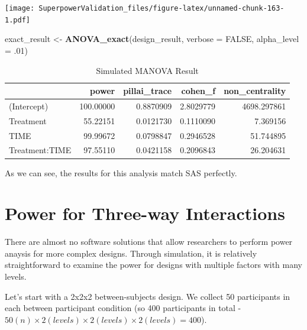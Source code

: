 \documentclass[
]{book}
\newenvironment{Shaded}{\begin{snugshade}}{\end{snugshade}}
\newcommand{\DataTypeTok}[1]{\textcolor[rgb]{0.13,0.29,0.53}{#1}}
\newcommand{\FloatTok}[1]{\textcolor[rgb]{0.00,0.00,0.81}{#1}}
\newcommand{\KeywordTok}[1]{\textcolor[rgb]{0.13,0.29,0.53}{\textbf{#1}}}
\newcommand{\NormalTok}[1]{#1}
\newcommand{\OtherTok}[1]{\textcolor[rgb]{0.56,0.35,0.01}{#1}}
\newcommand{\StringTok}[1]{\textcolor[rgb]{0.31,0.60,0.02}{#1}}
\begin{document}
\texttt{[image: SuperpowerValidation\_files/figure-latex/unnamed-chunk-163-1.pdf]}

\begin{Shaded}
\begin{Highlighting}[]
\NormalTok{exact_result <-}\StringTok{ }\KeywordTok{ANOVA_exact}\NormalTok{(design_result, }\DataTypeTok{verbose =} \OtherTok{FALSE}\NormalTok{,}
                            \DataTypeTok{alpha_level =} \FloatTok{.01}\NormalTok{)}
\end{Highlighting}
\end{Shaded}

\begin{table}[!h]

\caption{\label{tab:unnamed-chunk-164}Simulated MANOVA Result}
\centering
\begin{tabular}[t]{l|r|r|r|r}
\hline
  & power & pillai\_trace & cohen\_f & non\_centrality\\
\hline
(Intercept) & 100.00000 & 0.8870909 & 2.8029779 & 4698.297861\\
\hline
Treatment & 55.22151 & 0.0121730 & 0.1110090 & 7.369156\\
\hline
TIME & 99.99672 & 0.0798847 & 0.2946528 & 51.744895\\
\hline
Treatment:TIME & 97.55110 & 0.0421158 & 0.2096843 & 26.204631\\
\hline
\end{tabular}
\end{table}

As we can see, the results for this analysis match SAS perfectly.

\hypertarget{power-for-three-way-interactions}{%
\chapter{Power for Three-way Interactions}\label{power-for-three-way-interactions}}

There are almost no software solutions that allow researchers to perform power anaysis for more complex designs. Through simulation, it is relatively straightforward to examine the power for designs with multiple factors with many levels.

Let's start with a 2x2x2 between-subjects design. We collect 50 participants in each between participant condition (so 400 participants in total - \(50(n)\times2(levels)\times2(levels)\times2(levels)= 400\)).
\end{document}
